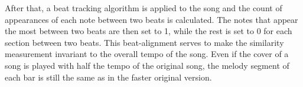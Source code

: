 \noindent After that, a beat tracking algorithm is applied to the song and the count of appearances of each note between two beats is calculated. The notes that appear the most between two beats are then set to 1, while the rest is set to 0 for each section between two beats. This beat-alignment serves to make the similarity measurement invariant to the overall tempo of the song. Even if the cover of a song is played with half the tempo of the original song, the melody segment of each bar is still the same as in the faster original version.

\begin{figure}[htbp]
	\centering
\end{figure}
